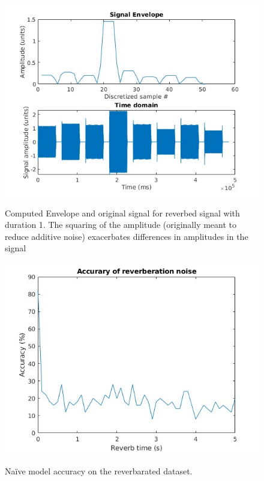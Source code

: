 \documentclass{article}
\begin{document}
\begin{figure}[h]
	\includegraphics[width =\textwidth]{part4envelope.jpg}
	\label{part4envelope}
	\caption{Computed Envelope and original signal for reverbed signal with duration 1. The squaring of the amplitude (originally meant to reduce additive noise) exacerbates differences in amplitudes in the signal}
\end{figure}
\begin{figure}[h]
	\includegraphics[width =\textwidth]{reverbacc.jpg}
	\label{reverbacc}
	\caption{Naïve model accuracy on the reverbarated dataset.}
\end{figure}
\end{document}
